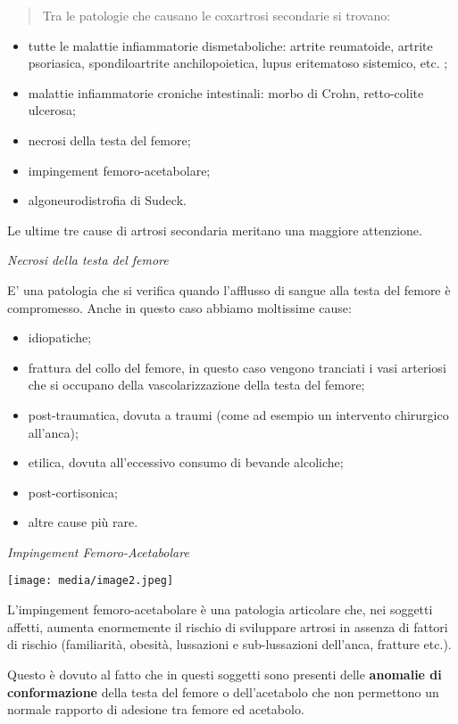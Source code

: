 \documentclass[]{article}
\begin{document}
\begin{quote}
Tra le patologie che causano le coxartrosi secondarie si trovano:
\end{quote}

\begin{itemize}
\item
  tutte le malattie infiammatorie dismetaboliche: artrite reumatoide,
  artrite psoriasica, spondiloartrite anchilopoietica, lupus eritematoso
  sistemico, etc. ;
\item
  malattie infiammatorie croniche intestinali: morbo di Crohn,
  retto-colite ulcerosa;
\item
  necrosi della testa del femore;
\item
  impingement femoro-acetabolare;
\item
  algoneurodistrofia di Sudeck.
\end{itemize}

Le ultime tre cause di artrosi secondaria meritano una maggiore
attenzione.

\emph{Necrosi della testa del femore}

E' una patologia che si verifica quando l'afflusso di sangue alla testa
del femore è compromesso. Anche in questo caso abbiamo moltissime cause:

\begin{itemize}
\item
  idiopatiche;
\item
  frattura del collo del femore, in questo caso vengono tranciati i vasi
  arteriosi che si occupano della vascolarizzazione della testa del
  femore;
\item
  post-traumatica, dovuta a traumi (come ad esempio un intervento
  chirurgico all'anca);
\item
  etilica, dovuta all'eccessivo consumo di bevande alcoliche;
\item
  post-cortisonica;
\item
  altre cause più rare.
\end{itemize}

\emph{Impingement Femoro-Acetabolare}

\texttt{[image: media/image2.jpeg]}

L'impingement femoro-acetabolare è una patologia articolare che, nei
soggetti affetti, aumenta enormemente il rischio di sviluppare artrosi
in assenza di fattori di rischio (familiarità, obesità, lussazioni e
sub-lussazioni dell'anca, fratture etc.).

Questo è dovuto al fatto che in questi soggetti sono presenti delle
\textbf{anomalie di conformazione} della testa del femore o
dell'acetabolo che non permettono un normale rapporto di adesione tra
femore ed acetabolo.
\end{document}
